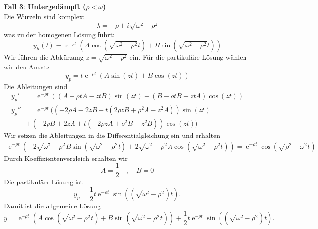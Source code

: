 {\noindent
\textbf{Fall 3: Untergedämpft (\(\rho < \omega\))} \\
Die Wurzeln sind komplex:
\[
\lambda = -\rho \pm i\sqrt{\omega^2 - \rho^2}
\]
was zu der homogenen Lösung führt:
\[
y_h(t) = \operatorname{e}^{-\rho t}(A \cos(\sqrt{\omega^2 - \rho^2} t) + B \sin(\sqrt{\omega^2 - \rho^2} t))
\]
Wir führen die Abkürzung $z = \sqrt{\omega^2 - \rho^2}$ ein.
Für die partikuläre Lösung wählen wir den Ansatz
$$
y_p = t\operatorname{e}^{-\rho t}(A\sin(zt) + B\cos(zt)) 
$$
Die Ableitungen sind
\begin{align*}
y_p' &= \operatorname{e}^{-\rho t}((A- \rho t A - ztB)\sin(zt) + (B-\rho t B + ztA) \cos(zt))\\
y_p'' &= \operatorname{e}^{-\rho t}( (-2\rho A - 2zB + t(2\rho zB + \rho^2 A -z^2A)) \sin(zt) \\
&+
          (-2\rho B +2zA + t(-2\rho zA + \rho^2 B - z^2B)) \cos(zt))
\end{align*}
Wir setzen die Ableitungen in die Differentialgleichung ein und erhalten
\begin{align*}
\operatorname{e}^{-\rho t}(-2\sqrt{\omega^2 - \rho^2}B \sin(\sqrt{\omega^2-\rho^2}t)
+2\sqrt{\omega^2 - \rho^2}A \cos(\sqrt{\omega^2-\rho^2}t) ) = 
 \operatorname{e}^{-\rho t} \cos(\sqrt{\rho^2 - \omega^2}t)
\end{align*}
Durch Koeffizientenvergleich erhalten wir
$$
A= \frac{1}{2} \quad , \quad B =0
$$
Die partikuläre Lösung ist
$$
y_p = \frac{1}{2}t\operatorname{e}^{-\rho t} \sin((\sqrt{\omega^2 - \rho^2})t).
$$
Damit ist die allgemeine Lösung
$$
y = \operatorname{e}^{-\rho t}(A \cos(\sqrt{\omega^2 - \rho^2} t) + B \sin(\sqrt{\omega^2 - \rho^2} t))+\frac{1}{2}t\operatorname{e}^{-\rho t} \sin((\sqrt{\omega^2 - \rho^2})t).
$$
}




